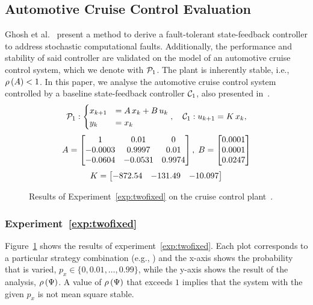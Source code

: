 \subsection{Automotive Cruise Control Evaluation}%
\label{sec:samarjit}

Ghosh et al.~\cite{Ghosh:2018} present a method to derive a fault-tolerant state-feedback controller to address stochastic computational faults.
Additionally, the performance and stability of said controller are validated on the model of an automotive cruise control system, which we denote with $\mathcal{P}_1$.
The plant is inherently stable, i.e., $\rho\left( A \right) < 1$.
In this paper, we analyse the automotive cruise control system controlled by a baseline state-feedback controller $\mathcal{C}_1$, also presented in~\cite{Ghosh:2018}.
%
\begin{equation*}%
    \plant_1: \begin{cases}
        x_{k+1} &= \Ap\,x_k+\Bp\, u_k\\
        y_k &= x_k
    \end{cases}, \quad
    \ctrler_1: u_{k+1} = \Dc\,x_k,
\end{equation*}
\begin{equation*}
    A = \begin{bmatrix}
        1 & 0.01 & 0 \\
        -0.0003 & 0.9997 & 0.01 \\
        -0.0604 & -0.0531 & 0.9974
    \end{bmatrix}, \; B = \begin{bmatrix}
        0.0001 \\
        0.0001 \\
        0.0247
    \end{bmatrix}
\end{equation*}
\begin{equation*}%
    \Dc = \begin{bmatrix}
        -872.54 & -131.49 & -10.097
    \end{bmatrix}
\end{equation*}

\begin{figure}[t]
    \centering
    \caption{Results of Experiment~\ref{exp:twofixed} on the cruise control plant~\cite{Ghosh:2018}.}
    \label{fig:samarjit-fix2}
\end{figure}

\subsubsection*{Experiment~\ref{exp:twofixed}}%
%
Figure~\ref{fig:samarjit-fix2} shows the results of experiment~\ref{exp:twofixed}.
Each plot corresponds to a particular strategy combination (e.g., \tKZ{}) and the x-axis shows the probability that is varied, $p_x \in \{0,0.01,\dots,0.99\}$, while the y-axis shows the result of the analysis, $\rho\left( \Psi \right)$.
A value of $\rho\left( \Psi \right)$ that exceeds $1$ implies that the system with the given $p_x$ is not mean square stable.

